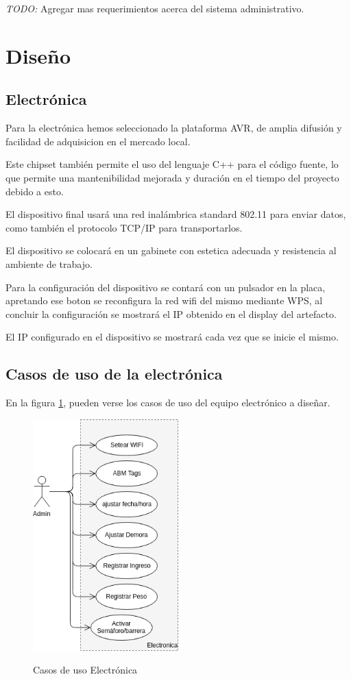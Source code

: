 \emph{TODO:} Agregar mas requerimientos acerca del sistema administrativo.

\section{Dise\~no}
\subsection{Electr\'onica}
Para la electr\'onica hemos seleccionado la plataforma AVR, de amplia difusi\'on y facilidad de adquisicion en el mercado local.

Este chipset tambi\'en permite el uso del lenguaje C++ para el c\'odigo fuente, lo que permite una mantenibilidad mejorada y duraci\'on en el tiempo del proyecto debido a esto.

El dispositivo final usar\'a una red inal\'ambrica standard 802.11 para enviar datos, como tambi\'en el protocolo TCP/IP para transportarlos.

El dispositivo se colocar\'a en un gabinete con estetica adecuada y resistencia al ambiente de trabajo.

Para la configuración del dispositivo se contará con un pulsador en la placa, apretando ese boton se reconfigura 
la red wifi del mismo mediante WPS, al concluir la configuración se mostrará el IP obtenido en el display del artefacto.

El IP configurado en el dispositivo se mostrará cada vez que se inicie el mismo.
\subsection{Casos de uso de la electr\'onica}
En la figura \ref{fig:usecase}, pueden verse los casos de uso del equipo electr\'onico a dise\~nar.
\begin{figure}[h!]
	\caption{Casos de uso Electr\'onica}
	\includegraphics[width=0.5\textwidth]{images/casos_uso_electronica.png}
	\label{fig:usecase}
\end{figure}

